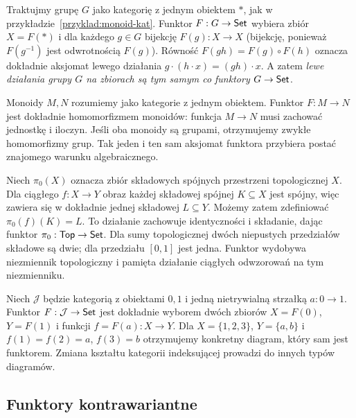 \begin{przyklad}\label{przyklad:dzialanie-funktor}
Traktujmy grupę $G$ jako kategorię z jednym obiektem $*$, jak w przykładzie~\ref{przyklad:monoid-kat}. Funktor $F:G\to\mathsf{Set}$ wybiera zbiór $X=F(*)$ i dla każdego $g\in G$ bijekcję $F(g):X\to X$ (bijekcję, ponieważ $F(g^{-1})$ jest odwrotnością $F(g)$). Równość $F(gh)=F(g)\circ F(h)$ oznacza dokładnie aksjomat lewego działania $g\cdot(h\cdot x)=(gh)\cdot x$. A zatem \emph{lewe działania grupy $G$ na zbiorach są tym samym co funktory $G\to\mathsf{Set}$}.
\end{przyklad}

\begin{przyklad}
Monoidy $M,N$ rozumiemy jako kategorie z jednym obiektem. Funktor $F:M\to N$ jest dokładnie homomorfizmem monoidów: funkcja $M\to N$ musi zachować jednostkę i iloczyn. Jeśli oba monoidy są grupami, otrzymujemy zwykłe homomorfizmy grup. Tak jeden i ten sam aksjomat funktora przybiera postać znajomego warunku algebraicznego.
\end{przyklad}


\begin{przyklad}
Niech $\pi_0(X)$ oznacza zbiór składowych spójnych przestrzeni topologicznej $X$. Dla ciągłego $f:X\to Y$ obraz każdej składowej spójnej $K\subseteq X$ jest spójny, więc zawiera się w dokładnie jednej składowej $L\subseteq Y$. Możemy zatem zdefiniować $\pi_0(f)(K)=L$. To działanie zachowuje identyczności i składanie, dając funktor $\pi_0:\mathsf{Top}\to\mathsf{Set}$. Dla sumy topologicznej dwóch niepustych przedziałów składowe są dwie; dla przedziału $[0,1]$ jest jedna. Funktor wydobywa niezmiennik topologiczny i pamięta działanie ciągłych odwzorowań na tym niezmienniku.
\end{przyklad}

\begin{przyklad}
Niech $\mathcal J$ będzie kategorią z obiektami $0,1$ i jedną nietrywialną strzałką $a:0\to1$. Funktor $F:\mathcal J\to\mathsf{Set}$ jest dokładnie wyborem dwóch zbiorów $X=F(0)$, $Y=F(1)$ i funkcji $f=F(a):X\to Y$. Dla $X=\{1,2,3\}$, $Y=\{a,b\}$ i $f(1)=f(2)=a$, $f(3)=b$ otrzymujemy konkretny diagram, który sam jest funktorem. Zmiana kształtu kategorii indeksującej prowadzi do innych typów diagramów.
\end{przyklad}


\subsection{Funktory kontrawariantne}

